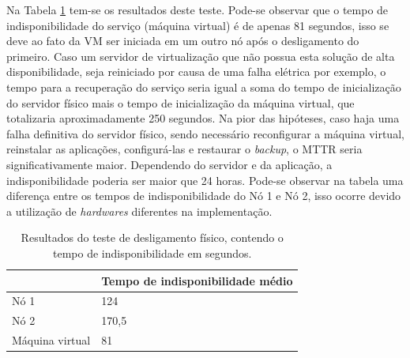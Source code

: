 Na Tabela \ref{tab:teste1resultados} tem-se os resultados deste teste. Pode-se observar que o tempo de indisponibilidade do serviço 
(máquina virtual) é de apenas 81 segundos, isso se deve ao fato da \ac{VM} ser iniciada em um outro nó após o desligamento do primeiro. 
Caso um servidor de virtualização que não possua esta solução de alta disponibilidade, seja reiniciado por causa de uma falha elétrica por 
exemplo, o tempo para a recuperação do serviço seria igual a soma do tempo de inicialização do servidor físico mais o tempo de inicialização 
da máquina virtual, que totalizaria aproximadamente 250 segundos. 
Na pior das hipóteses, caso haja uma falha definitiva do servidor físico, sendo necessário reconfigurar a máquina virtual, reinstalar as aplicações,
configurá-las e restaurar o \textit{backup}, o \ac{MTTR} seria significativamente maior. Dependendo do servidor e da aplicação, 
a indisponibilidade poderia ser maior que 24 horas.
Pode-se observar na tabela uma diferença entre os tempos de indisponibilidade do Nó 1 e Nó 2, isso ocorre devido a utilização de \textit{hardwares}
diferentes na implementação. 



\begin{table}[h!]
\caption{Resultados do teste de desligamento físico, contendo o tempo de indisponibilidade em segundos.}
\small
\label{tab:teste1resultados}
\begin{center}
\begin{tabular}{|l|l|}\hline
 & \textbf{Tempo de indisponibilidade médio} \\\hline %
Nó 1 & 124 \\\hline %
Nó 2 & 170,5 \\\hline %
Máquina virtual & 81 \\\hline %
\end{tabular}
\end{center}
\end{table}

